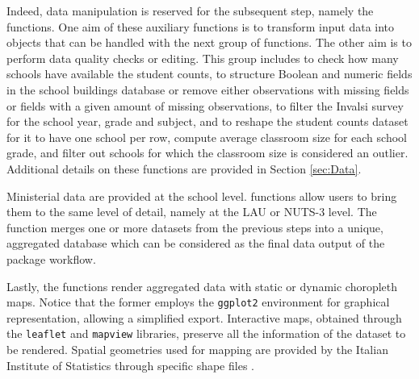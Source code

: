 \documentclass{article}%
\begin{document}
Indeed, data manipulation is reserved for the subsequent step, namely the \texttt{} functions. One aim of these auxiliary functions is to transform input data into objects that can be handled with the next group of functions. The other aim is to perform data quality checks or editing. This group includes \texttt{} to check how many schools have available the student counts, \texttt{} to structure Boolean and numeric fields in the school buildings database or remove either observations with missing fields or fields with a given amount of missing observations, \texttt{} to filter the Invalsi survey for the school year, grade and subject, and \texttt{} to reshape the student counts dataset for it to have one school per row, compute average classroom size for each school grade, and filter out schools for which the classroom size is considered an outlier. Additional details on these functions are provided in Section \ref{sec:Data}. 

Ministerial data are provided at the school level. \texttt{} functions allow users to bring them to the same level of detail, namely at the LAU or NUTS-3 level. The function \texttt{} merges one or more datasets from the previous steps into a unique, aggregated database which can be considered as the final data output of the package workflow.

Lastly, the \texttt{} functions render aggregated data with static or dynamic choropleth maps. Notice that the former employs the \texttt{ggplot2} \citep{ggplot} environment for graphical representation, allowing a simplified export. Interactive maps, obtained through the \texttt{leaflet} \citep{leaflet} and \texttt{mapview} \citep{mapview} libraries, preserve all the information of the dataset to be rendered. Spatial geometries used for mapping are provided by the Italian Institute of Statistics through specific shape files \citep{Shapefiles}.

 

\end{document}
